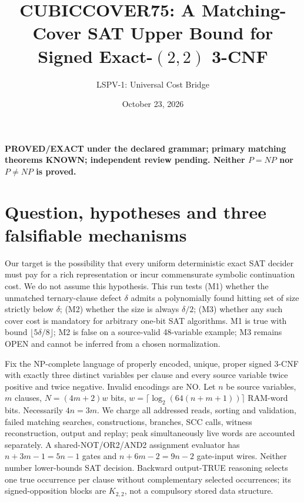 \documentclass[11pt]{article}
\title{CUBICCOVER75: A Matching-Cover SAT Upper Bound for Signed Exact-$(2,2)$ 3-CNF}
\author{LSPV-1: Universal Cost Bridge}
\date{October 23, 2026}
\begin{document}
\maketitle
\begin{center}
\textbf{PROVED/EXACT under the declared grammar; primary matching theorems KNOWN; independent review pending. Neither $P=NP$ nor $P\ne NP$ is proved.}
\end{center}

\section{Question, hypotheses and three falsifiable mechanisms}
Our target is the possibility that every uniform deterministic exact SAT decider must pay for a rich representation or incur commensurate symbolic continuation cost. We do not assume this hypothesis. This run tests (M1) whether the unmatched ternary-clause defect $\delta$ admits a polynomially found hitting set of size strictly below $\delta$; (M2) whether the size is always $\delta/2$; (M3) whether any such cover cost is mandatory for arbitrary one-bit SAT algorithms. M1 is true with bound $\lfloor5\delta/8\rfloor$; M2 is false on a source-valid 48-variable example; M3 remains OPEN and cannot be inferred from a chosen normalization.

Fix the NP-complete language of properly encoded, unique, proper signed 3-CNF with exactly three distinct variables per clause and every source variable twice positive and twice negative. Invalid encodings are NO. Let $n$ be source variables, $m$ clauses, $N=(4m+2)w$ bits, $w=\lceil\log_2(64(n+m+1))\rceil$ RAM-word bits. Necessarily $4n=3m$. We charge all addressed reads, sorting and validation, failed matching searches, constructions, branches, SCC calls, witness reconstruction, output and replay; peak simultaneously live words are accounted separately. A shared-NOT/OR2/AND2 assignment evaluator has $n+3m-1=5n-1$ gates and $n+6m-2=9n-2$ gate-input wires. Neither number lower-bounds SAT decision. Backward output-TRUE reasoning selects one true occurrence per clause without complementary selected occurrences; its signed-opposition blocks are $K_{2,2}$, not a compulsory stored data structure.
\end{document}
